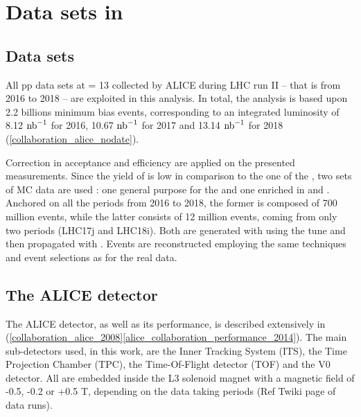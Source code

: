 \newpage
\section{Data sets in \pp}
\label{sec:Section02}

\subsection{Data sets}
\label{sec:Section02.a-}

All pp data sets at \sqrtS = 13 \tev collected by ALICE during LHC run II -- that is from 2016 to 2018 -- are exploited in this analysis. In total, the analysis is based upon 2.2 billions minimum bias events, corresponding to an integrated luminosity of 8.12 $\mbox{\ensuremath{\text{nb}}}^{-1}$ for 2016, 10.67 $\mbox{\ensuremath{\text{nb}}}^{-1}$ for 2017 and 13.14 $\mbox{\ensuremath{\text{nb}}}^{-1}$ for 2018 (\ref{collaboration_alice_nodate}). 

Correction in acceptance and efficiency are applied on the presented measurements. Since the yield of \rmOmegaPM is low in comparison to the one of the \rmPhiMes, two sets of MC data are used : one general purpose for the \rmPhiMes and one enriched in \rmXiPM and \rmOmegaPM. Anchored on all the periods from 2016 to 2018, the former is composed of 700 million events, while the latter consists of 12 million events, coming from only two periods (LHC17j and LHC18i). Both are generated with \Pythiaeight using the \Monash tune and then propagated with \Geantfour. Events are reconstructed employing the same techniques and event selections as for the real data.

\subsection{The ALICE detector}
\label{sec:Section02.b-}

The ALICE detector, as well as its performance, is described extensively in (\ref{collaboration_alice_2008}\ref{alice_collaboration_performance_2014}). The main sub-detectors used, in this work, are the Inner Tracking System (ITS), the Time Projection Chamber (TPC), the Time-Of-Flight detector (TOF) and the V0 detector. All are embedded inside the L3 solenoid magnet with a magnetic field of -0.5, -0.2 or +0.5 T, depending on the data taking periods (Ref Twiki page of data runs).

